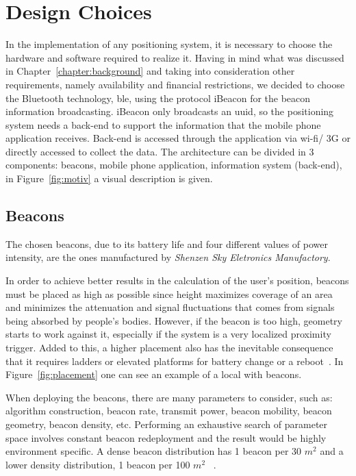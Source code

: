 \chapter{Design Choices}
\label{chapter:designchoices}

In the implementation of any positioning system, it is necessary to choose the hardware and software required to realize it. 
Having in mind what was discussed in Chapter~\ref{chapter:background} and taking into consideration other requirements, namely availability and financial restrictions, we decided to choose the Bluetooth technology, \gls{ble}, using the protocol iBeacon for the beacon information broadcasting. iBeacon only broadcasts an \gls{uuid}, so the positioning system needs a back-end to support the information that the mobile phone application receives. Back-end is accessed through the application via \gls{wi-fi}/ 3G or directly accessed to collect the data. The architecture can be divided in 3 components: beacons, mobile phone application, information system (back-end), in Figure~\ref{fig:motiv} a visual description is given.



\section{Beacons}
\label{section:beaconsdesign}

The chosen beacons, due to its battery life and four different values of power intensity, are the ones manufactured by \textit{Shenzen Sky Eletronics Manufactory}.

In order to achieve better results in the calculation of the user's position, beacons must be placed as high as possible since height maximizes coverage of an area and minimizes the attenuation and signal fluctuations that comes from signals being absorbed by people’s bodies. However, if the beacon is too high, geometry starts to work against it, especially if the system is a very localized proximity trigger. Added to this, a higher placement also has the inevitable consequence that it requires ladders or elevated platforms for battery change or a reboot~\citep{Statler}. In Figure~\ref{fig:placement} one can see an example of a local with beacons.

When deploying the beacons, there are many parameters to consider, such as: algorithm construction, beacon rate, transmit power, beacon mobility, beacon geometry, beacon density, etc. Performing an exhaustive search of parameter space involves constant beacon redeployment and the result would be highly environment specific. A dense beacon distribution has 1 beacon per 30 $m^{2}$ and a lower density distribution, 1 beacon per 100 $m^{2}$ ~\citep{fingerprintingble}.

